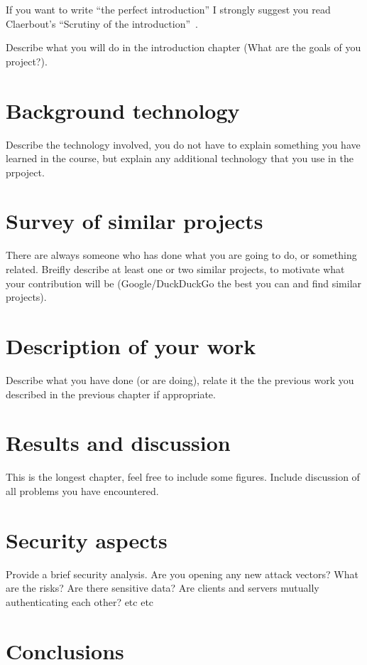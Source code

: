 If you want to write ``the perfect introduction'' I strongly suggest you
read Claerbout's ``Scrutiny of the introduction''~\cite{Claerbout:95}.

Describe what you will do in the introduction chapter (What are the goals of
you project?).

\section{Background technology}

Describe the technology involved, you do not have to explain something you have
learned in the course, but explain any additional technology that you use in
the prpoject.

\section{Survey of similar projects}

There are always someone who has done what you are going to do, or
something related. Breifly describe at least one or two similar projects,
to motivate what your contribution will be (Google/DuckDuckGo the best you can
and find similar projects).

\section{Description of your work}

Describe what you have done (or are doing), relate it the the previous work
you described in the previous chapter if appropriate.

\section{Results and discussion}

This is the longest chapter, feel free to include some figures. Include
discussion of all problems you have encountered.

\section{Security aspects}

Provide a brief security analysis. Are you opening any new attack vectors? What
are the risks? Are there sensitive data? Are clients and servers mutually
authenticating each other? etc etc

\section{Conclusions}

